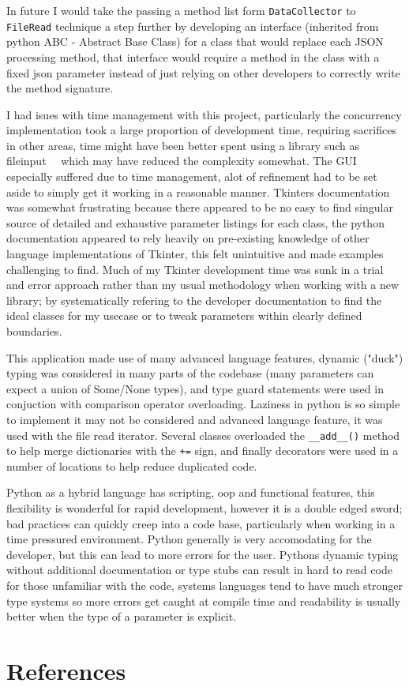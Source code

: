 \documentclass[11pt]{article}
\newcommand{\code}[1]{\colorbox{light-gray}{\texttt{#1}}}
\begin{document}
In future I would take the passing a method list form \code{DataCollector} to \code{FileRead} technique a step further by developing an interface (inherited from python ABC - Abstract Base Class) for a class that would replace each JSON processing method, that interface would require a method in the class with a fixed json parameter instead of just relying on other developers to correctly write the method signature.

I had isues with time management with this project, particularly the concurrency implementation took a large proportion of development time, requiring sacrifices in other areas, time might have been better spent using a library such as fileinput~~\autocite{FileinputIterateLines} which may have reduced the complexity somewhat.
The GUI especially suffered due to time management, alot of refinement had to be set aside to simply get it working in a reasonable manner.
Tkinters documentation was somewhat frustrating because there appeared to be no easy to find singular source of detailed and exhaustive parameter listings for each class, the python documentation appeared to rely heavily on pre-existing knowledge of other language implementations of Tkinter, this felt unintuitive and made examples challenging to find. 
Much of my Tkinter development time was sunk in a trial and error approach rather than my usual methodology when working with a new library; by systematically refering to the developer documentation to find the ideal classes for my usecase or to tweak parameters within clearly defined boundaries.

This application made use of many advanced language features, dynamic ("duck") typing was considered in many parts of the codebase (many parameters can expect a union of Some/None types), and type guard statements were used in conjuction with comparison operator overloading.
Laziness in python is so simple to implement it may not be considered and advanced language feature, it was used with the file read iterator.
Several classes overloaded the \code{\_\_add\_\_()} method to help merge dictionaries with the \code{+=} sign, and finally decorators were used in a number of locations to help reduce duplicated code.

Python as a hybrid language has scripting, oop and functional features, this flexibility is wonderful for rapid development, however it is a double edged sword; bad practices can quickly creep into a code base, particularly when working in a time pressured environment.
Python generally is very accomodating for the developer, but this can lead to more errors for the user.
Pythons dynamic typing without additional documentation or type stubs can result in hard to read code for those unfamiliar with the code, systems languages tend to have much stronger type systems so more errors get caught at compile time and readability is usually better when the type of a parameter is explicit. 

\pagebreak
\appendix
\section{References}
\printbibliography
\end{document}
